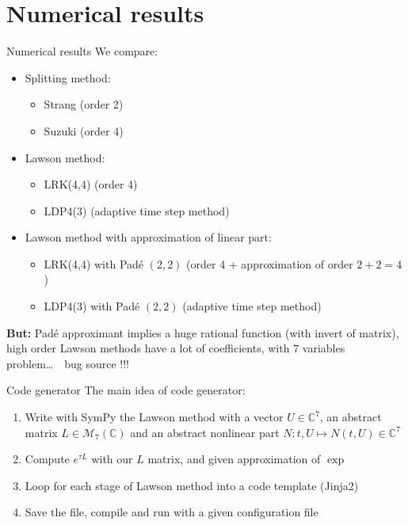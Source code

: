 \documentclass{beamer}
\newcommand{\arrow}{{\color{PLB}\ding{220}}}
\newcommand{\mbold}[1]{{\textbf{\color{PLB}#1}}}
\begin{document}
\section{Numerical results}
\begin{frame}{Numerical results}
  We compare:
  \begin{itemize}
    \item Splitting method:\begin{itemize}
      \item Strang (order 2)
      \item Suzuki (order 4)
    \end{itemize}
    \item Lawson method:\begin{itemize}
      \item LRK(4,4) (order 4)
      \item LDP4(3) (adaptive time step method)
    \end{itemize}
    \item Lawson method with approximation of linear part:\begin{itemize}
      \item LRK(4,4) with Padé $(2,2)$ (order 4 + approximation of order $2+2=4$)
      \item LDP4(3) with Padé $(2,2)$ (adaptive time step method)
    \end{itemize}
  \end{itemize}

  \mbold{But:} Padé approximant implies a huge rational function (with invert of matrix), high order Lawson methods have a lot of coefficients, with 7 variables problem\dots \ \arrow \ bug source !!!
\end{frame}
\begin{frame}{Code generator}
  The main idea of code generator:
  \begin{enumerate}
    \item Write with SymPy the Lawson method with a vector $U\in\mathbb{C}^7$, an abstract matrix $L\in\mathcal{M}_7(\mathbb{C})$ and an abstract nonlinear part $N:t,U\mapsto N(t,U)\in\mathbb{C}^7$
    \item Compute $e^{\tau L}$ with our $L$ matrix, and given approximation of $\exp$
    \item Loop for each stage of Lawson method into a code template (Jinja2)
    \item Save the file, compile and run with a given configuration file
  \end{enumerate}
\end{frame}
\end{document}

